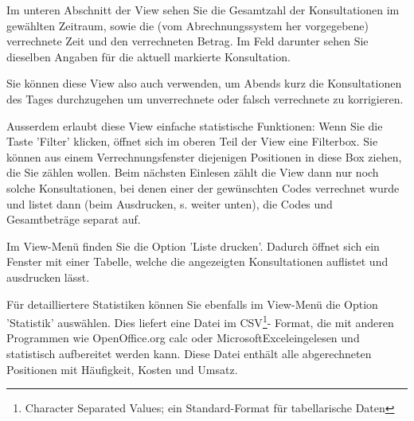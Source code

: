 \medskip

Im unteren Abschnitt der View sehen Sie die Gesamtzahl der Konsultationen im
gewählten Zeitraum, sowie die (vom Abrechnungssystem her vorgegebene)
verrechnete Zeit und den verrechneten Betrag. Im Feld darunter sehen Sie
dieselben Angaben für die aktuell markierte Konsultation.

Sie können diese View also auch verwenden, um Abends kurz die Konsultationen des Tages
durchzugehen um unverrechnete oder falsch verrechnete zu korrigieren.

\medskip

Ausserdem erlaubt diese View einfache statistische Funktionen:
Wenn Sie die Taste 'Filter' klicken, öffnet sich im oberen Teil der View eine Filterbox. Sie können aus einem Verrechnungsfenster diejenigen Positionen in diese Box ziehen, die Sie zählen wollen. Beim nächsten Einlesen zählt die View dann nur noch solche Konsultationen, bei denen einer der gewünschten Codes verrechnet wurde und listet dann (beim Ausdrucken, s. weiter unten), die Codes und Gesamtbeträge separat auf.

\medskip

 Im View-Menü finden Sie die Option 'Liste drucken'. Dadurch öffnet sich ein Fenster mit einer Tabelle, welche die angezeigten Konsultationen auflistet und ausdrucken lässt.

\medskip

 Für detailliertere Statistiken können Sie ebenfalls im View-Menü die Option 'Statistik' auswählen. Dies liefert eine Datei im CSV\footnote{Character Separated Values; ein Standard-Format für tabellarische Daten}- Format, die mit anderen Programmen wie OpenOffice.org calc oder Microsoft\texttrademark Excel\texttrademark eingelesen und statistisch aufbereitet werden kann. Diese Datei enthält alle abgerechneten Positionen mit Häufigkeit, Kosten und Umsatz.


